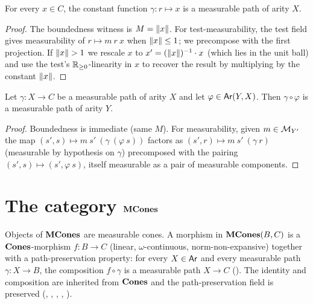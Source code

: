 \begin{lemma}\label{lem:const-path}
  \rocqok
  For every $x \in C$, the constant function
  $\gamma : r \mapsto x$ is a measurable path of arity $X$.
\end{lemma}
\begin{proof}
  The boundedness witness is $M = \lVert x \rVert$. For
  test-measurability, the test field
   gives measurability of
  $r \mapsto m\ r\ x$ when $\lVert x \rVert \le 1$; we precompose with the
  first projection. If $\lVert x \rVert > 1$ we rescale $x$ to
  $x' = (\lVert x \rVert)^{-1} \cdot x$ (which lies in the unit ball) and
  use the test's $\mathbb{R}_{\geq 0}$-linearity in $x$ to recover the result by
  multiplying by the constant $\lVert x \rVert$.
\end{proof}

\begin{lemma}%
  \label{lem:path-reindex}
  \rocqok
  Let $\gamma : X \to C$ be a measurable path of arity $X$ and let
  $\varphi \in \mathsf{Ar}(Y, X)$. Then $\gamma \circ \varphi$ is a
  measurable path of arity $Y$.
\end{lemma}
\begin{proof}
  Boundedness is immediate (same $M$). For measurability, given
  $m \in \mathcal{M}_{Y'}$ the map
  $(s', s) \mapsto m\ s'\ (\gamma\ (\varphi\ s))$ factors as
  $(s', r) \mapsto m\ s'\ (\gamma\ r)$ (measurable by hypothesis on
  $\gamma$) precomposed with the pairing $(s', s) \mapsto (s',
  \varphi\ s)$, itself measurable as a pair of measurable
  components.
\end{proof}

\section{The category \texorpdfstring{$\mathbf{MCones}$}{MCones}}%
\label{sec:cat-mcones}

\begin{definition}%
  \label{def:mcones-hom}
  \rocqok
  Objects of $\mathbf{MCones}$ are measurable cones. A morphism in
  $\mathbf{MCones}(B, C)$ is a $\mathbf{Cones}$-morphism $f : B \to C$ (linear,
  $\omega$-continuous, norm-non-expansive) together with a
  path-preservation property: for every $X \in \mathsf{Ar}$ and every
  measurable path $\gamma : X \to B$, the composition
  $f \circ \gamma$ is a measurable path $X \to C$
  ().
  The identity and composition are inherited from $\mathbf{Cones}$ and the
  path-preservation field is preserved
  (,
   ,
   ,
   ,
   ).\rocqok
\end{definition}

